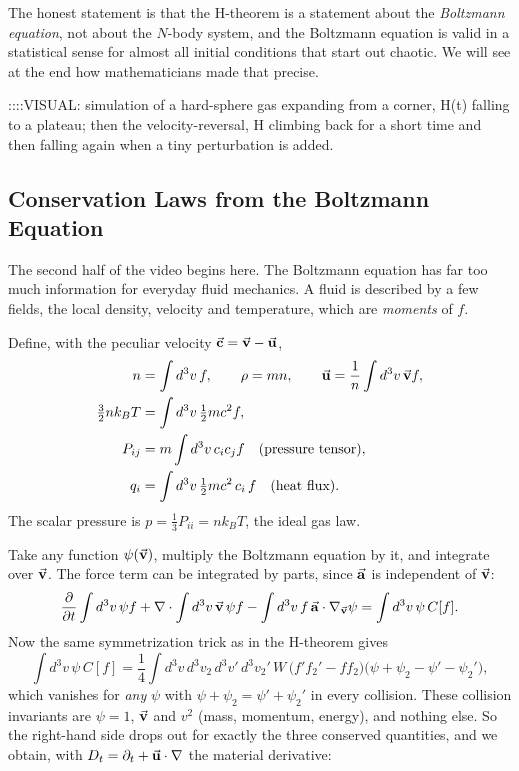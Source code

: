 The honest statement is that the H-theorem is a statement about the \emph{Boltzmann equation}, not about the $N$-body system, and the Boltzmann equation is valid in a statistical sense for almost all initial conditions that start out chaotic. We will see at the end how mathematicians made that precise.


::::VISUAL: simulation of a hard-sphere gas expanding from a corner, H(t) falling to a plateau; then the velocity-reversal, H climbing back for a short time and then falling again when a tiny perturbation is added.

\subsection{Conservation Laws from the Boltzmann Equation}

The second half of the video begins here. The Boltzmann equation has far too much information for everyday fluid mechanics. A fluid is described by a few fields, the local density, velocity and temperature, which are \emph{moments} of $f$.

Define, with the peculiar velocity $\va c=\va v-\va u$,
\begin{align*}
n &= \int d^3v\,f, \qquad \rho=mn, \qquad \va u = \frac1n\int d^3v\,\va v f,\\
\tfrac32 n k_B T &= \int d^3v\,\tfrac12 m c^2 f, \\
P_{ij} &= m\int d^3v\,c_ic_jf \quad\text{(pressure tensor)},\\
q_i &= \int d^3v\,\tfrac12 mc^2\,c_i\,f \quad\text{(heat flux)}.
\end{align*}
The scalar pressure is $p=\tfrac13P_{ii}=nk_BT$, the ideal gas law.

Take any function $\psi(\va v)$, multiply the Boltzmann equation by it, and integrate over $\va v$. The force term can be integrated by parts, since $\va a$ is independent of $\va v$:
\[
\pdv{}{t}\int d^3v\,\psi f + \nabla\cdot\int d^3v\,\va v\,\psi f - \int d^3v\,f\,\va a\cdot\nabla_{\va v}\psi = \int d^3v\,\psi\,C[f].
\]
Now the same symmetrization trick as in the H-theorem gives
\[
\int d^3v\,\psi\,C[f] = \frac14\int d^3v\,d^3v_2\,d^3v'\,d^3v_2'\, W\,\big(f'f_2'-ff_2\big)\big(\psi+\psi_2-\psi'-\psi_2'\big),
\]
which vanishes for \emph{any} $\psi$ with $\psi+\psi_2=\psi'+\psi_2'$ in every collision. These collision invariants are $\psi=1$, $\va v$ and $v^2$ (mass, momentum, energy), and nothing else. So the right-hand side drops out for exactly the three conserved quantities, and we obtain, with $D_t=\partial_t+\va u\cdot\nabla$ the material derivative:

